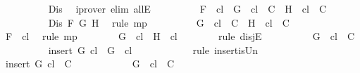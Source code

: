 \begin{isabellebody}
\ \ \ \ \ \ \ \ \isamarkupfalse%
\ Dis\ \isamarkupfalse%
\ {\isacharparenleft}iprover\ elim{\isacharcolon}\ allE{\isacharparenright}\isanewline
\ \ \ \ \ \ \isamarkupfalse%
\ \isamarkupfalse%
\ {\isachardoublequoteopen}F\ {\isasymin}\ {\isacharquery}cl\ {\isasymlongrightarrow}\ {\isacharbraceleft}G{\isacharbraceright}\ {\isasymunion}\ {\isacharquery}cl\ {\isasymin}\ C\ {\isasymor}\ {\isacharbraceleft}H{\isacharbraceright}\ {\isasymunion}\ {\isacharquery}cl\ {\isasymin}\ C{\isachardoublequoteclose}\isanewline
\ \ \ \ \ \ \ \ \isamarkupfalse%
\ {\isacartoucheopen}Dis\ F\ G\ H{\isacartoucheclose}\ \isamarkupfalse%
\ {\isacharparenleft}rule\ mp{\isacharparenright}\isanewline
\ \ \ \ \ \ \isamarkupfalse%
\ \isamarkupfalse%
\ {\isachardoublequoteopen}{\isacharbraceleft}G{\isacharbraceright}\ {\isasymunion}\ {\isacharquery}cl\ {\isasymin}\ C\ {\isasymor}\ {\isacharbraceleft}H{\isacharbraceright}\ {\isasymunion}\ {\isacharquery}cl\ {\isasymin}\ C{\isachardoublequoteclose}\isanewline
\ \ \ \ \ \ \ \ \isamarkupfalse%
\ {\isacartoucheopen}F\ {\isasymin}\ {\isacharquery}cl{\isacartoucheclose}\ \isamarkupfalse%
\ {\isacharparenleft}rule\ mp{\isacharparenright}\isanewline
\ \ \ \ \ \ \isamarkupfalse%
\ {\isachardoublequoteopen}G\ {\isasymin}\ {\isacharquery}cl\ {\isasymor}\ H\ {\isasymin}\ {\isacharquery}cl{\isachardoublequoteclose}\isanewline
\ \ \ \ \ \ \isamarkupfalse%
\ {\isacharparenleft}rule\ disjE{\isacharparenright}\isanewline
\ \ \ \ \ \ \ \ \isamarkupfalse%
\ {\isachardoublequoteopen}{\isacharbraceleft}G{\isacharbraceright}\ {\isasymunion}\ {\isacharquery}cl\ {\isasymin}\ C{\isachardoublequoteclose}\isanewline
\ \ \ \ \ \ \ \ \isamarkupfalse%
\ {\isachardoublequoteopen}insert\ G\ {\isacharquery}cl\ {\isacharequal}\ {\isacharbraceleft}G{\isacharbraceright}\ {\isasymunion}\ {\isacharquery}cl{\isachardoublequoteclose}\isanewline
\ \ \ \ \ \ \ \ \ \ \isamarkupfalse%
\ {\isacharparenleft}rule\ insert{\isacharunderscore}is{\isacharunderscore}Un{\isacharparenright}\isanewline
\ \ \ \ \ \ \ \ \isamarkupfalse%
\ {\isachardoublequoteopen}insert\ G\ {\isacharquery}cl\ {\isasymin}\ C{\isachardoublequoteclose}\isanewline
\ \ \ \ \ \ \ \ \ \ \isamarkupfalse%
\ {\isacartoucheopen}{\isacharbraceleft}G{\isacharbraceright}\ {\isasymunion}\ {\isacharquery}cl\ {\isasymin}\ C{\isacartoucheclose}\ \isamarkupfalse%

\end{isabellebody}
